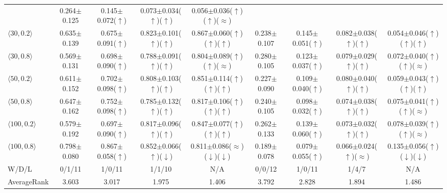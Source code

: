 \documentclass[10pt,journal]{IEEEtran}
\begin{document}
\begin{table}[!t]
{\begin{tabular}{@{}lcccccccc@{}}
& 0.264$\pm$0.125 & 0.145$\pm$0.072($\uparrow$) & 0.073$\pm$0.034($\uparrow$)($\uparrow$) & 0.056$\pm$0.036($\uparrow$)($\uparrow$)($\approx$) \\
$\langle30,0.2\rangle$
& 0.635$\pm$0.139 & 0.675$\pm$0.091($\uparrow$) & 0.823$\pm$0.101($\uparrow$)($\uparrow$) & 0.867$\pm$0.060($\uparrow$)($\uparrow$)($\uparrow$)
& 0.238$\pm$0.107 & 0.145$\pm$0.051($\uparrow$) & 0.082$\pm$0.038($\uparrow$)($\uparrow$) & 0.054$\pm$0.046($\uparrow$)($\uparrow$)($\uparrow$) \\
$\langle30,0.8\rangle$
& 0.569$\pm$0.131 & 0.698$\pm$0.090($\uparrow$) & 0.788$\pm$0.091($\uparrow$)($\uparrow$) & 0.804$\pm$0.089($\uparrow$)($\uparrow$)($\approx$)
& 0.280$\pm$0.105 & 0.123$\pm$0.037($\uparrow$) & 0.079$\pm$0.029($\uparrow$)($\uparrow$) & 0.072$\pm$0.040($\uparrow$)($\uparrow$)($\approx$) \\
$\langle50,0.2\rangle$
& 0.611$\pm$0.152 & 0.702$\pm$0.098($\uparrow$) & 0.808$\pm$0.103($\uparrow$)($\uparrow$) & 0.851$\pm$0.114($\uparrow$)($\uparrow$)($\uparrow$)
& 0.227$\pm$0.090 & 0.109$\pm$0.040($\uparrow$) & 0.080$\pm$0.040($\uparrow$)($\uparrow$) & 0.059$\pm$0.043($\uparrow$)($\uparrow$)($\uparrow$) \\
$\langle50,0.8\rangle$
& 0.647$\pm$0.162 & 0.752$\pm$0.098($\uparrow$) & 0.785$\pm$0.132($\uparrow$)($\uparrow$) & 0.817$\pm$0.106($\uparrow$)($\uparrow$)($\uparrow$)
& 0.240$\pm$0.105 & 0.098$\pm$0.032($\uparrow$) & 0.074$\pm$0.038($\uparrow$)($\uparrow$) & 0.075$\pm$0.041($\uparrow$)($\uparrow$)($\approx$) \\
$\langle100,0.2\rangle$
& 0.579$\pm$0.192 & 0.697$\pm$0.090($\uparrow$) & 0.817$\pm$0.096($\uparrow$)($\uparrow$) & 0.847$\pm$0.077($\uparrow$)($\uparrow$)($\uparrow$)
& 0.262$\pm$0.133 & 0.139$\pm$0.060($\uparrow$) & 0.073$\pm$0.032($\uparrow$)($\uparrow$) & 0.078$\pm$0.039($\uparrow$)($\uparrow$)($\approx$) \\
$\langle100,0.8\rangle$
& 0.798$\pm$0.080 & 0.867$\pm$0.058($\uparrow$) & 0.852$\pm$0.066($\uparrow$)($\downarrow$) & 0.811$\pm$0.086($\approx$)($\downarrow$)($\downarrow$)
& 0.189$\pm$0.078 & 0.079$\pm$0.055($\uparrow$) & 0.066$\pm$0.024($\uparrow$)($\approx$) & 0.135$\pm$0.056($\uparrow$)($\downarrow$)($\downarrow$) \\
\midrule
W/D/L & 0/1/11 & 1/0/11 & 1/1/10 & N/A
      & 0/0/12 & 1/0/11 & 1/4/7 & N/A \\
AverageRank & 3.603 & 3.017 & 1.975 & 1.406
            & 3.792 & 2.828 & 1.894 & 1.486 \\
\bottomrule
\end{tabular}}
\end{table}
\end{document}
